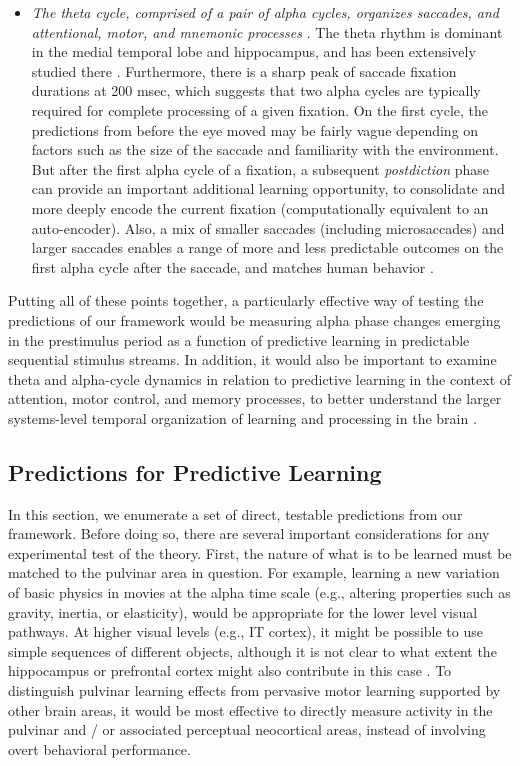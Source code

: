 \documentclass[11pt,twoside]{article}
\newif\myifpdf
\begin{document}
\begin{itemize}
	\item \emph{The theta cycle, comprised of a pair of alpha cycles, organizes saccades, and attentional, motor, and mnemonic processes} \citep{FiebelkornKastner19}.  The theta rhythm is dominant in the medial temporal lobe and hippocampus, and has been extensively studied there \citep{KahanaSeeligMadsen01,Buzsaki05}.  Furthermore, there is a  sharp peak of saccade fixation durations at 200 msec, which suggests that two alpha cycles are typically required for  complete processing of a given fixation.  On the first cycle, the predictions from before the eye moved may be fairly vague depending on factors such as the size of the saccade and familiarity with the environment.  But after the first alpha cycle of a fixation, a subsequent \emph{postdiction} phase can provide an important additional learning opportunity, to consolidate and more deeply encode the current fixation (computationally equivalent to an auto-encoder).  Also, a mix of smaller saccades (including microsaccades) and larger saccades enables a range of more and less predictable outcomes on the first alpha cycle after the saccade, and matches human behavior \citep{Martinez-CondeOtero-MillanMacknik13,Martinez-CondeMacknikHubel04}.
	
\end{itemize}

Putting all of these points together, a particularly effective way of testing the predictions of our framework would be measuring alpha phase changes emerging in the prestimulus period as a function of predictive learning in predictable sequential stimulus streams.  In addition, it would also be important to examine theta and alpha-cycle dynamics in relation to predictive learning in the context of attention, motor control, and memory processes, to better understand the larger systems-level temporal organization of learning and processing in the brain \citep{FiebelkornKastner19}.

\subsection{Predictions for Predictive Learning}

In this section, we enumerate a set of direct, testable predictions from our framework.  Before doing so, there are several important considerations for any experimental test of the theory.  First, the nature of what is to be learned must be matched to the pulvinar area in question.  For example, learning a new variation of basic physics in movies at the alpha time scale (e.g., altering properties such as gravity, inertia, or elasticity), would be appropriate for the lower level visual pathways.  At higher visual levels (e.g., IT cortex), it might be possible to use simple sequences of different objects, although it is not clear to what extent the hippocampus or prefrontal cortex might also contribute in this case \citep{GavornikBear14,FiserMahringerOyiboEtAl16}.  To distinguish pulvinar learning effects from pervasive motor learning supported by other brain areas, it would be most effective to directly measure activity in the pulvinar and / or associated perceptual neocortical areas, instead of involving overt behavioral performance. 
\end{document}
